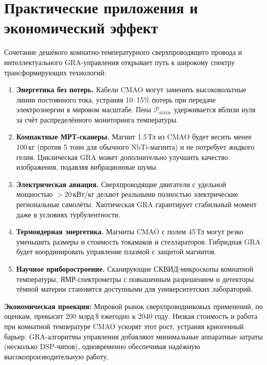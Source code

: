 \documentclass[12pt,a4paper]{article}
\numberwithin{equation}{section}
\begin{document}
\section{Практические приложения и экономический эффект}
\label{sec:applications}

Сочетание дешёвого комнатно-температурного сверхпроводящего провода и интеллектуального GRA-управления открывает путь к широкому спектру трансформирующих технологий:

\begin{enumerate}
    \item \textbf{Энергетика без потерь.} Кабели CMAO могут заменить высоковольтные линии постоянного тока, устраняя 10--15\% потерь при передаче электроэнергии в мировом масштабе. Пена $\mathcal{P}_{\text{static}}$ удерживается вблизи нуля за счёт распределённого мониторинга температуры.
    
    \item \textbf{Компактные МРТ-сканеры.} Магнит 1.5\,Тл из CMAO будет весить менее 100\,кг (против 5 тонн для обычного NbTi-магнита) и не потребует жидкого гелия. Циклическая GRA может дополнительно улучшить качество изображения, подавляя вибрационные шумы.
    
    \item \textbf{Электрическая авиация.} Сверхпроводящие двигатели с удельной мощностью $>20$\,кВт/кг делают реальными полностью электрические региональные самолёты. Хаотическая GRA гарантирует стабильный момент даже в условиях турбулентности.
    
    \item \textbf{Термоядерная энергетика.} Магниты CMAO с полем 45\,Тл могут резко уменьшить размеры и стоимость токамаков и стеллараторов. Гибридная GRA будет координировать управление плазмой с защитой магнитов.
    
    \item \textbf{Научное приборостроение.} Сканирующие СКВИД-микроскопы комнатной температуры, ЯМР-спектрометры с повышенным разрешением и детекторы тёмной материи становятся доступными для университетских лабораторий.
\end{enumerate}

\textbf{Экономическая проекция:} Мировой рынок сверхпроводниковых применений, по оценкам, превысит 200 млрд\,\$ ежегодно к 2040 году. Низкая стоимость и работа при комнатной температуре CMAO ускорят этот рост, устраняя криогенный барьер. GRA-алгоритмы управления добавляют минимальные аппаратные затраты (несколько DSP-чипов), одновременно обеспечивая надёжную высокопроизводительную работу.
\end{document}
